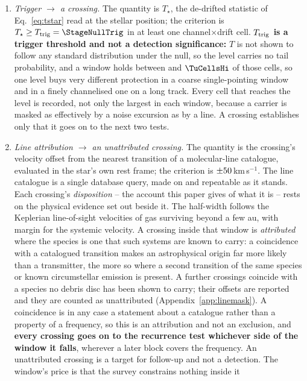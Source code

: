 \begin{enumerate}[label=(\roman*),leftmargin=1.9em,itemsep=3pt,topsep=3pt,parsep=0pt]
\item \emph{Trigger $\to$ a crossing.} The quantity is $T_\star$, the
de-drifted statistic of Eq.~\ref{eq:tstar} read at the stellar position; the
criterion is $T_\star\geq T_{\rm trig}=\StageNullTrig$ in at least one
channel$\times$drift cell. \textbf{$T_{\rm trig}$ is a trigger
threshold and not a detection significance:} $T$ is not shown to follow any
standard distribution under the null, so the level carries no tail
probability, and a window holds between \TuCellsLo{} and $\TuCellsHi$ of
those cells, so one level buys very different protection in a coarse
single-pointing window and in a finely channelised one on a long track. Every
cell that reaches the level is recorded, not only the largest in each window,
because a carrier is masked as effectively by a noise excursion as by a line.
A crossing establishes only that it goes on to the next two tests.
\item \emph{Line attribution $\to$ an unattributed crossing.} The quantity
is the crossing's velocity offset from the nearest transition of a
molecular-line catalogue, evaluated in the star's own rest frame; the
criterion is $\pm50$\,km\,s$^{-1}$. The line catalogue is a
single database query, made on \MkListDate{} and repeatable as it stands.
Each crossing's \emph{disposition} -- the account this paper
gives of what it is -- rests on the physical evidence set out beside it.
The half-width follows the Keplerian line-of-sight
velocities of gas
surviving beyond a few au, with margin for the systemic velocity. A crossing
inside that window is \emph{attributed} where the species is one that such
systems are known to carry: a coincidence with a catalogued transition makes
an astrophysical origin far more likely than a transmitter, the more so
where a second transition of the same species or known circumstellar
emission is present. A further \MkNSODecideWord{} crossings coincide with a
species no debris disc has been shown to carry; their offsets are reported
and they are counted as unattributed (Appendix~\ref{app:linemask}).
A coincidence is in any case a statement about a catalogue rather than a
property of a frequency, so this is an attribution and not an exclusion, and
\textbf{every crossing goes on to the recurrence test whichever side of the
window it falls}, wherever a later block covers the frequency. An
unattributed crossing is a target for follow-up and not a detection. The
window's price is that the survey constrains nothing inside it

\end{enumerate}
